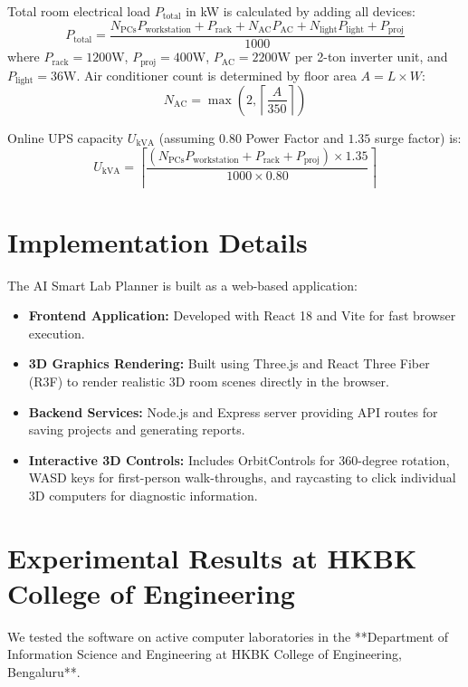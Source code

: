 \documentclass[conference]{IEEEtran}
\begin{document}
Total room electrical load $P_{\text{total}}$ in kW is calculated by adding all devices:
\begin{equation}
P_{\text{total}} = \frac{N_{\text{PCs}} P_{\text{workstation}} + P_{\text{rack}} + N_{\text{AC}} P_{\text{AC}} + N_{\text{light}} P_{\text{light}} + P_{\text{proj}}}{1000}
\end{equation}
where $P_{\text{rack}} = 1200\text{W}$, $P_{\text{proj}} = 400\text{W}$, $P_{\text{AC}} = 2200\text{W}$ per 2-ton inverter unit, and $P_{\text{light}} = 36\text{W}$. Air conditioner count is determined by floor area $A = L \times W$:
\begin{equation}
N_{\text{AC}} = \max\left(2, \left\lceil \frac{A}{350} \right\rceil\right)
\end{equation}

Online UPS capacity $U_{\text{kVA}}$ (assuming $0.80$ Power Factor and $1.35$ surge factor) is:
\begin{equation}
U_{\text{kVA}} = \left\lceil \frac{\left( N_{\text{PCs}} P_{\text{workstation}} + P_{\text{rack}} + P_{\text{proj}} \right) \times 1.35}{1000 \times 0.80} \right\rceil
\end{equation}

\section{Implementation Details}
The AI Smart Lab Planner is built as a web-based application:
\begin{itemize}
    \item \textbf{Frontend Application:} Developed with React 18 and Vite for fast browser execution.
    \item \textbf{3D Graphics Rendering:} Built using Three.js and React Three Fiber (R3F) to render realistic 3D room scenes directly in the browser.
    \item \textbf{Backend Services:} Node.js and Express server providing API routes for saving projects and generating reports.
    \item \textbf{Interactive 3D Controls:} Includes OrbitControls for 360-degree rotation, WASD keys for first-person walk-throughs, and raycasting to click individual 3D computers for diagnostic information.
\end{itemize}

\section{Experimental Results at HKBK College of Engineering}
We tested the software on active computer laboratories in the **Department of Information Science and Engineering at HKBK College of Engineering, Bengaluru**.
\end{document}
